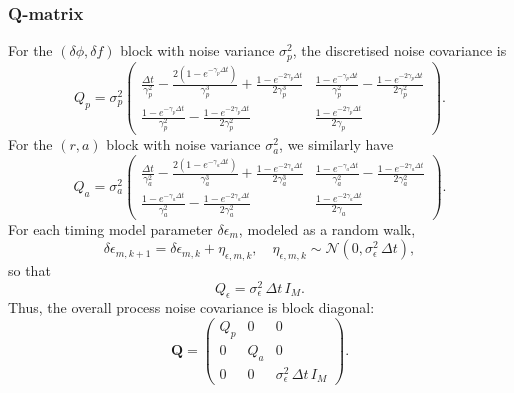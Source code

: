 \documentclass[]{scrartcl}
\begin{document}
	
\subsubsection{Q-matrix}
	
	For the $\left(\delta\phi,\delta f\right)$ block with noise variance $\sigma_p^2$, the discretised noise covariance is
	\begin{equation}
	Q_p = \sigma_p^2
	\begin{pmatrix}
		\displaystyle \frac{\Delta t}{\gamma_p^2} - \frac{2\left(1-e^{-\gamma_p\Delta t}\right)}{\gamma_p^3} + \frac{1-e^{-2\gamma_p\Delta t}}{2\gamma_p^3} & \displaystyle \frac{1-e^{-\gamma_p\Delta t}}{\gamma_p^2} - \frac{1-e^{-2\gamma_p\Delta t}}{2\gamma_p^2}\\[2mm]
		\displaystyle \frac{1-e^{-\gamma_p\Delta t}}{\gamma_p^2} - \frac{1-e^{-2\gamma_p\Delta t}}{2\gamma_p^2} & \displaystyle \frac{1-e^{-2\gamma_p\Delta t}}{2\gamma_p}
	\end{pmatrix}.
	\end{equation}
	For the $\left(r,a\right)$ block with noise variance $\sigma_a^2$, we similarly have
	\begin{equation}
	Q_a = \sigma_a^2
	\begin{pmatrix}
		\displaystyle \frac{\Delta t}{\gamma_a^2} - \frac{2\left(1-e^{-\gamma_a\Delta t}\right)}{\gamma_a^3} + \frac{1-e^{-2\gamma_a\Delta t}}{2\gamma_a^3} & \displaystyle \frac{1-e^{-\gamma_a\Delta t}}{\gamma_a^2} - \frac{1-e^{-2\gamma_a\Delta t}}{2\gamma_a^2}\\[2mm]
		\displaystyle \frac{1-e^{-\gamma_a\Delta t}}{\gamma_a^2} - \frac{1-e^{-2\gamma_a\Delta t}}{2\gamma_a^2} & \displaystyle \frac{1-e^{-2\gamma_a\Delta t}}{2\gamma_a}
	\end{pmatrix}.
	\end{equation}
	For each timing model parameter $\delta\epsilon_m$, modeled as a random walk,
	\begin{equation}
	\delta\epsilon_{m,k+1} = \delta\epsilon_{m,k} + \eta_{\epsilon,m,k}, \quad \eta_{\epsilon,m,k}\sim \mathcal{N}(0,\sigma_\epsilon^2\,\Delta t),
	\end{equation}
	so that
	\begin{equation}
	Q_\epsilon = \sigma_\epsilon^2\,\Delta t\,I_M.
	\end{equation}
	Thus, the overall process noise covariance is block diagonal:
	\begin{equation}
	\boldsymbol{Q} = \begin{pmatrix}
		Q_p & 0 & 0\\[2mm]
		0 & Q_a & 0\\[2mm]
		0 & 0 & \sigma_\epsilon^2\,\Delta t\,I_M
	\end{pmatrix}.
	\end{equation}
	
\end{document}
